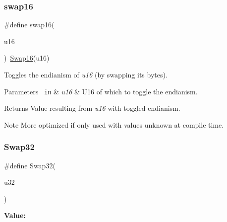 \subsubsection{\texorpdfstring{swap16}{swap16}}
{\footnotesize\ttfamily \#define swap16(\begin{DoxyParamCaption}\item[{}]{u16 }\end{DoxyParamCaption})~\mbox{\hyperlink{group__group__sam0__utils_gadc9a009f53db3e7c3294ee6bc1027dca}{Swap16}}(u16)}



Toggles the endianism of {\itshape u16} (by swapping its bytes). 


\begin{DoxyParams}[1]{Parameters}
\mbox{\texttt{ in}}  & {\em u16} & U16 of which to toggle the endianism.\\
\hline
\end{DoxyParams}
\begin{DoxyReturn}{Returns}
Value resulting from {\itshape u16} with toggled endianism.
\end{DoxyReturn}
\begin{DoxyNote}{Note}
More optimized if only used with values unknown at compile time. 
\end{DoxyNote}
\mbox{\label{group__group__sam0__utils_ga5e9bc2e3b3e43eadc3210b02cab6ac64}} 
\subsubsection{\texorpdfstring{Swap32}{Swap32}}
{\footnotesize\ttfamily \#define Swap32(\begin{DoxyParamCaption}\item[{}]{u32 }\end{DoxyParamCaption})}

{\bfseries Value\+:}
\begin{DoxyCode}{0}

\end{DoxyCode}


